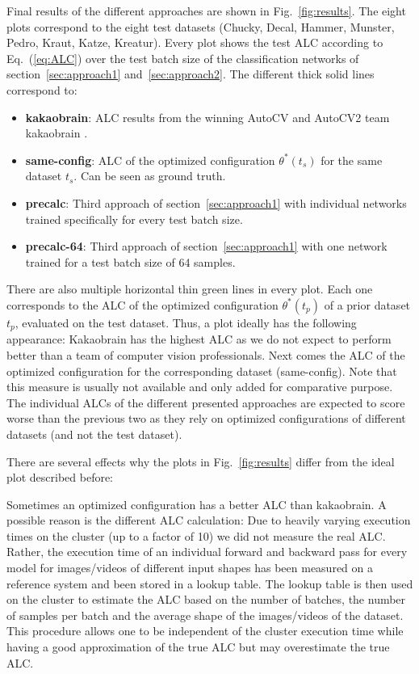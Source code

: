 \documentclass{article}
\begin{document}
Final results of the different approaches are shown in Fig.~\ref{fig:results}. The eight plots correspond to the eight test datasets (Chucky, Decal, Hammer, Munster, Pedro, Kraut, Katze, Kreatur). Every plot shows the test ALC according to Eq.~(\ref{eq:ALC}) over the test batch size of the classification networks of section~\ref{sec:approach1} and~\ref{sec:approach2}. The different thick solid lines correspond to:
\begin{itemize}
\item \textbf{kakaobrain}: ALC results from the winning AutoCV and AutoCV2 team kakaobrain \cite{kakaobrain}.
\item \textbf{same-config}: ALC of the optimized configuration $\theta^*(t_s)$ for the same dataset $t_s$. Can be seen as ground truth.
\item \textbf{precalc}: Third approach of section~\ref{sec:approach1} with individual networks trained specifically for every test batch size.
\item \textbf{precalc-64}: Third approach of section~\ref{sec:approach1} with one network trained for a test batch size of 64 samples.
\end{itemize}
There are also multiple horizontal thin green lines in every plot. Each one corresponds to the ALC of the optimized configuration $\theta^*(t_p)$ of a prior dataset $t_p$, evaluated on the test dataset. 
Thus, a plot ideally has the following appearance: Kakaobrain has the highest ALC as we do not expect to perform better than a team of computer vision professionals. Next comes the ALC of the optimized configuration for the corresponding dataset (same-config). Note that this measure is usually not available and only added for comparative purpose. The individual ALCs of the different presented approaches are expected to score worse than the previous two as they rely on optimized configurations of different datasets (and not the test dataset). 

There are several effects why the plots in Fig.~\ref{fig:results} differ from the ideal plot described before: 

Sometimes an optimized configuration has a better ALC than kakaobrain. A possible reason is the different ALC calculation: Due to heavily varying execution times on the cluster (up to a factor of 10) we did not measure the real ALC. Rather, the execution time of an individual forward and backward pass for every model for images/videos of different input shapes has been measured on a reference system and been stored in a lookup table. The lookup table is then used on the cluster to estimate the ALC based on the number of batches, the number of samples per batch and the average shape of the images/videos of the dataset. This procedure allows one to be independent of the cluster execution time while having a good approximation of the true ALC but may overestimate the true ALC.
\end{document}
